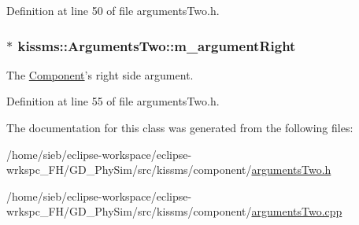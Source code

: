 Definition at line 50 of file arguments\-Two.\-h.

\hypertarget{classkissms_1_1_arguments_two_a6c3c75623ef11c44443dc37b6574247e}{
\subsubsection[{m\-\_\-argument\-Right}]{$\ast$ kissms\-::\-Arguments\-Two\-::m\-\_\-argument\-Right\hspace{0.3cm}{\ttfamily [protected]}}}\label{classkissms_1_1_arguments_two_a6c3c75623ef11c44443dc37b6574247e}


The \hyperlink{classkissms_1_1_component}{Component}'s right side argument. 



Definition at line 55 of file arguments\-Two.\-h.



The documentation for this class was generated from the following files\-:\begin{DoxyCompactItemize}
\item 
/home/sieb/eclipse-\/workspace/eclipse-\/wrkspc\-\_\-\-F\-H/\-G\-D\-\_\-\-Phy\-Sim/src/kissms/component/\hyperlink{arguments_two_8h}{arguments\-Two.\-h}\item 
/home/sieb/eclipse-\/workspace/eclipse-\/wrkspc\-\_\-\-F\-H/\-G\-D\-\_\-\-Phy\-Sim/src/kissms/component/\hyperlink{arguments_two_8cpp}{arguments\-Two.\-cpp}\end{DoxyCompactItemize}
